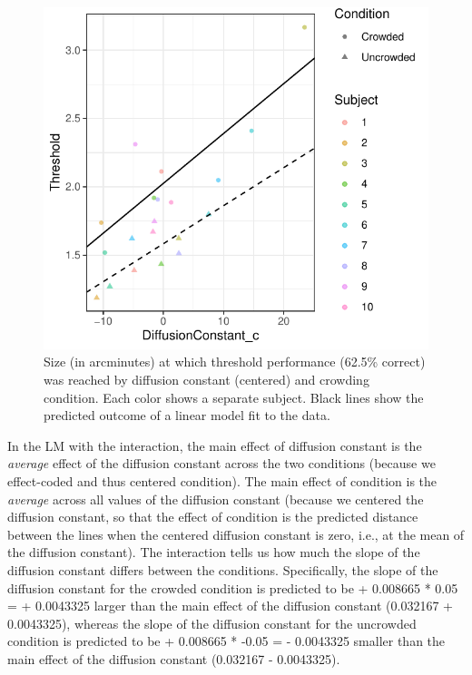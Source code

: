 \documentclass[
]{article}
\begin{document}
\footnotesize

\begin{figure}

{\centering \includegraphics{tutorial_files/figure-latex/unnamed-chunk-22-1} 

}

\caption{Size (in arcminutes) at which threshold performance (62.5\% correct) was reached by diffusion constant (centered) and crowding condition. Each color shows a separate subject. Black lines show the predicted outcome of a linear model fit to the data.}\label{fig:unnamed-chunk-22}
\end{figure}

\normalsize

In the LM with the interaction, the main effect of diffusion constant is
the \emph{average} effect of the diffusion constant across the two
conditions (because we effect-coded and thus centered condition). The
main effect of condition is the \emph{average} across all values of the
diffusion constant (because we centered the diffusion constant, so that
the effect of condition is the predicted distance between the lines when
the centered diffusion constant is zero, i.e., at the mean of the
diffusion constant). The interaction tells us how much the slope of the
diffusion constant differs between the conditions. Specifically, the
slope of the diffusion constant for the crowded condition is predicted
to be + 0.008665 * 0.05 = + 0.0043325 larger than the main effect of the
diffusion constant (0.032167 + 0.0043325), whereas the slope of the
diffusion constant for the uncrowded condition is predicted to be +
0.008665 * -0.05 = - 0.0043325 smaller than the main effect of the
diffusion constant (0.032167 - 0.0043325).
\end{document}
